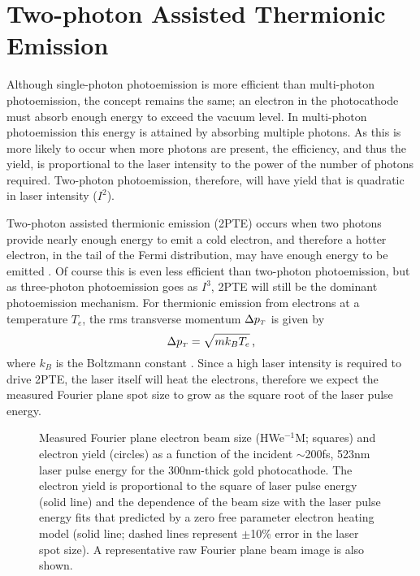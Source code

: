 
\section{Two-photon Assisted Thermionic Emission} \label{sec:two_photon_thermionic}

Although single-photon photoemission is more efficient than multi-photon photoemission, the concept remains the same; an electron in the photocathode must absorb enough energy to exceed the vacuum level.
In multi-photon photoemission this energy is attained by absorbing multiple photons.
As this is more likely to occur when more photons are present, the efficiency, and thus the yield, is proportional to the laser intensity to the power of the number of photons required.
Two-photon photoemission, therefore, will have yield that is quadratic in laser intensity ($I^2$).

Two-photon assisted thermionic emission (2PTE) occurs when two photons provide nearly enough energy to emit a cold electron, and therefore a hotter electron, in the tail of the Fermi distribution, may have enough energy to be emitted \cite{yen_thermally_1980}.
Of course this is even less efficient than two-photon photoemission, but as three-photon photoemission goes as $I^3$, 2PTE will still be the dominant photoemission mechanism.
For thermionic emission from electrons at a temperature $T_e$, the rms transverse momentum $\Delta p_{{\scriptscriptstyle T}}$ is given by 
\begin{equation}
  \Delta p_{{\scriptscriptstyle T}} = \sqrt{m k_B T_e} \,\text{,}
\end{equation}
where $k_B$ is the Boltzmann constant \cite{dowell_quantum_2009,jensen_emittance_2010}.
Since a high laser intensity is required to drive 2PTE, the laser itself will heat the electrons, therefore we expect the measured Fourier plane spot size to grow as the square root of the laser pulse energy.

\begin{figure}
  \centering
  
  \caption[Measured Fourier plane electron beam size and yield vs incident laser pulse energy on gold photocathode]{
    Measured Fourier plane electron beam size (HWe$^{-1}$M; squares) and electron yield (circles) as a function of the incident $\sim$200fs, 523nm laser pulse energy for the 300nm-thick gold photocathode.
    The electron yield is proportional to the square of laser pulse energy (solid line) and the dependence of the beam size with the laser pulse energy fits that predicted by a zero free parameter electron heating model (solid line; dashed lines represent $\pm$10\% error in the laser spot size).
    A representative raw Fourier plane beam image is also shown.
  }
  \label{fig:gold-emission}
\end{figure}

